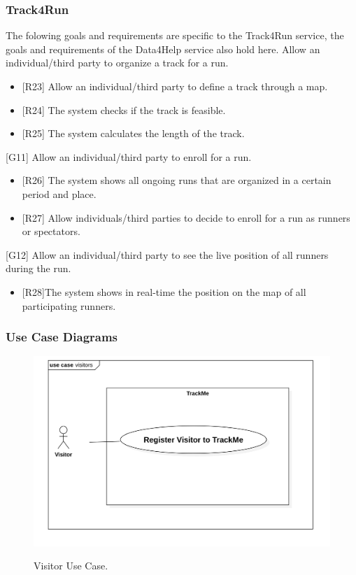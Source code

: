 \documentclass[12pt]{article}
\begin{document}
\subsubsection{Track4Run}
The folowing goals and requirements are specific to the Track4Run service, the goals and requirements of the Data4Help service also hold here.
\vspace{2mm}
\newline
[G10] Allow an individual/third party to organize a track for a run.\newline
\begin{itemize}
    \item {[R23]} Allow an individual/third party to define a track through a map. 
    \item {[R24]} The system checks if the track is feasible.
    \item {[R25]} The system calculates the length of the track. 
\end{itemize}
[G11] Allow an individual/third party to enroll for a run.\newline 
\begin{itemize}
    \item {[R26]} The system shows all ongoing runs that are organized in a certain period and place. 
    \item {[R27]} Allow individuals/third parties to decide to enroll for a run as runners or spectators.
\end{itemize}
[G12] Allow an individual/third party to see the live position of all runners during the run.\newline 
\begin{itemize}
    \item {[R28]}The system shows in real-time the position on the map of all participating runners.
\end{itemize}
\subsubsection{Use Case Diagrams}

\begin{figure}[H]
\includegraphics[scale=0.25]{VisitorUseCase.png}
\centering
\label{fig:VisitorUseCase}
\caption{Visitor Use Case.}
\end{figure}
\end{document}
